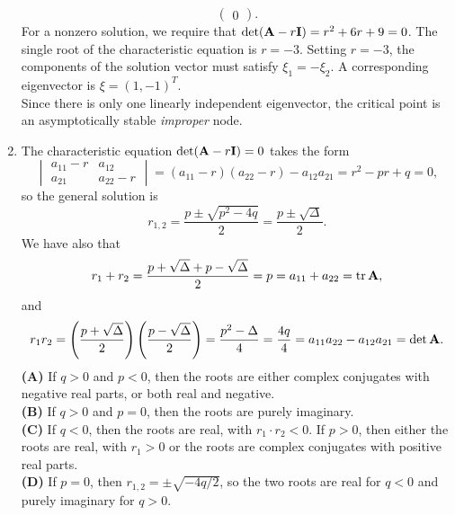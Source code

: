\documentclass[11pt,a4paper]{article}
\begin{document}
\begin{enumerate}
$$\begin{pmatrix}
			0
		\end{pmatrix}.
		$$
		For a nonzero solution, we require that $\det(\vb{A} - r\vb{I}) = r^2 + 6r + 9 = 0$. The single root of the characteristic equation is $r = -3$. Setting $r = -3$, the components of the solution vector must satisfy $\xi_1 = -\xi_2$. A corresponding eigenvector is $\xi = (1, -1)^T$.\\
		Since there is only one linearly independent eigenvector, the critical point is an asymptotically stable \textit{improper} node.
		\item The characteristic equation $\det(\vb{A} - r\vb{I}) = 0$ takes the form
		$$
		\begin{vmatrix}
			a_{11}-r & a_{12}\\
			a_{21} & a_{22} - r
		\end{vmatrix} = (a_{11} - r)(a_{22} - r) - a_{12}a_{21} = r^2 - pr + q = 0,
		$$
		so the general solution is
		$$
		r_{1,2} = \frac{p \pm \sqrt{p^2 - 4q}}{2} = \frac{p \pm \sqrt{\Delta}}{2}.
		$$
		We have also that
		$$
		r_1 + r_2 = \frac{p + \sqrt{\Delta} + p - \sqrt{\Delta}}{2} = p = a_{11} + a_{22} = \tr \vb{A},
		$$
		and
		$$
		r_1r_2 = \left(\frac{p + \sqrt{\Delta}}{2}\right)\left(\frac{p - \sqrt{\Delta}}{2}\right) = \frac{p^2 - \Delta}{4} = \frac{4q}{4} = a_{11}a_{22} - a_{12}a_{21} = \det\vb{A}.
		$$
		\textbf{(A)} If $q > 0$ and $p < 0$, then the roots are either complex conjugates with negative real parts, or both real and negative.\\
		\textbf{(B)} If $q > 0$ and $p = 0$, then the roots are purely imaginary.\\
		\textbf{(C)} If $q < 0$, then the roots are real, with $r_1 \cdot r_2 < 0$. If $p > 0$, then either the roots are real, with $r_1 > 0$ or the roots are complex conjugates with positive real parts.\\
		\textbf{(D)} If $p = 0$, then $r_{1,2} = \pm\sqrt{-4q/2}$, so the two roots are real for $q < 0$ and purely imaginary for $q > 0$.
	\end{enumerate}
\end{document}
